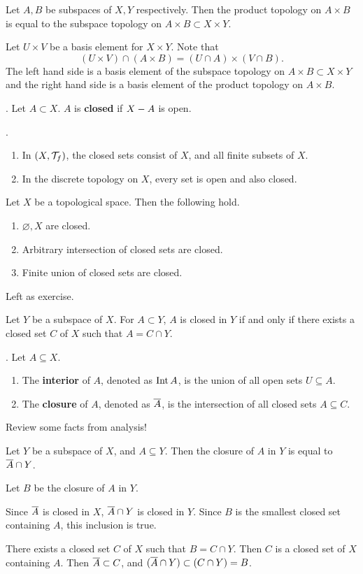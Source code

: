  Let \(A, B\) be subspaces of \(X, Y\) respectively. Then the product topology on \(A \times B\) is equal to the subspace topology on \(A \times B \subset X \times Y\).

\pf Let \(U \times V\) be a basis element for \(X \times Y\). Note that
\[
    (U\times V) \cap (A \times B) = (U\cap A) \times (V \cap B).
\]
The left hand side is a basis element of the subspace topology on \(A \times B \subset X \times Y\) and the right hand side is a basis element of the product topology on \(A \times B\).

\pagebreak


.  Let \(A \subset X\). \(A\) is \textbf{closed} if \(X - A\) is open.

\ex.
\begin{enumerate}
    \item In \((X, \mathcal{T}_f)\), the closed sets consist of \(X\), and all finite subsets of \(X\).
    \item In the discrete topology on \(X\), every set is open and also closed.
\end{enumerate}

 Let \(X\) be a topological space. Then the following hold.
\begin{enumerate}
    \item \(\varnothing, X\) are closed.
    \item Arbitrary intersection of closed sets are closed.
    \item Finite union of closed sets are closed.
\end{enumerate}

\pf Left as exercise.

 Let \(Y\) be a subspace of \(X\). For \(A \subset Y\), \(A\) is closed in \(Y\) if and only if there exists a closed set \(C\) of \(X\) such that \(A = C \cap Y\).

.  Let \(A \subseteq X\).
\begin{enumerate}
    \item The \textbf{interior} of \(A\), denoted as \(\operatorname{Int}{A}\), is the union of all open sets \(U \subseteq A\).
    \item The \textbf{closure} of \(A\), denoted as \(\overline{A}\), is the intersection of all closed sets \(A \subseteq C\).
\end{enumerate}

Review some facts from analysis!

 Let \(Y\) be a subspace of \(X\), and \(A \subseteq Y\). Then the closure of \(A\) in \(Y\) is equal to \(\overline{A} \cap Y\).

\pf Let \(B\) be the closure of \(A\) in \(Y\).

\note{\(\subset\)} Since \(\overline{A}\) is closed in \(X\), \(\overline{A} \cap Y\) is closed in \(Y\). Since \(B\) is the smallest closed set containing \(A\), this inclusion is true.

\note{\(\supset\)} There exists a closed set \(C\) of \(X\) such that \(B = C \cap Y\). Then \(C\) is a closed set of \(X\) containing \(A\). Then \(\overline{A} \subset C\), and \((\overline{A} \cap Y) \subset (C \cap Y) = B\).

\pagebreak
